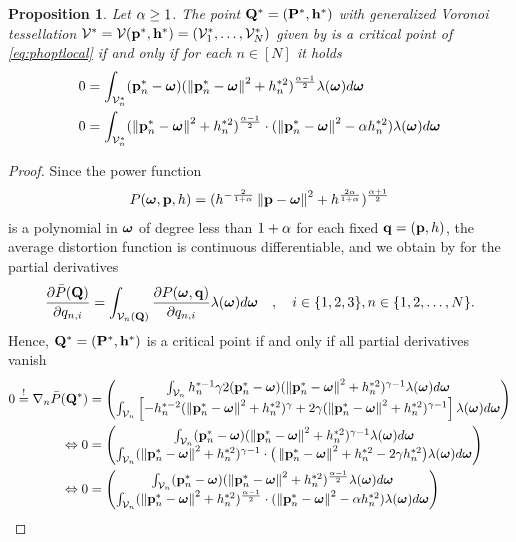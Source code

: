\documentclass[smallabstract,smallcaptions]{dccpaper}
\newtheorem{prop}{Proposition}
\newif\ifproof\prooffalse %
\newcommand{\df}{\ensuremath{\lam}}         %
\newcommand{\Pbar}{\ensuremath{\bar{P}}}         %
\newcommand{\Vor}{\ensuremath{\mathcal{V}}}         %
\begin{document}
\begin{prop}\label{prop:necessarycond}
  Let $\alpha \geq 1$. The point $\mathbf Q^*=(\mathbf P ^*,{\mathbf h}^*)$ with generalized Voronoi tessellation
  $\Vor^*=\Vor(\vp^*,\vh^*)=(\Vor_1^*,\dots,\Vor^*_N)$ given by  is a critical point of
  \eqref{eq:phoptlocal} if  and only if for each $n\in[N]$ it holds
  \begin{align}
    0&= \int_{\Vor^*_n} (\vp^*_{n}-\vome) (\Norm{\vp^*_n-\vome}^2 +h_n^{*2})^{\frac{\alp-1}{2}} \df(\vome)d
    \vome\label{eq:pnopt}\\
    0&= \int_{\Vor^*_n} (\Norm{\vp^*_n-\vome}^2 +h_n^{*2})^{\frac{\alp-1}{2}}\cdot (\Norm{\vp_n^*-\vome}^2 - \alp
    h_n^{*2} ) \df(\vome)d\vome
  \label{eq:criticalpoint}
  \end{align}
\end{prop}
%
\ifproof
\begin{proof}
Since the power function 
%
\begin{align}
  P(\boldsymbol{ \omega},{\mathbf p},h)= (h^{-\frac{2}{1+\alpha}} \left\|{\mathbf p}-\boldsymbol{ \omega}\right\| ^2 + h^{\frac{2\alpha}{1+\alpha}})^{\frac{\alpha+1}{2}}
\end{align}  
%
is a polynomial in $\boldsymbol{ \omega}$ of degree less than $1+\alpha$ for each fixed ${\mathbf q}=({\mathbf p},h)$, the average distortion function is continuous
differentiable, and we obtain by \cite[Thm.1]{WJ18} for the partial derivatives 
%
\begin{align}
  \frac{\partial \Pbar(\vQ)}{\partial q_{n,i}} = \int_{\Vor_n(\vQ)} \frac{\partial P(\vome,\vq)}{\partial q_{n,i}}
  \df(\vome)d\vome\quad,\quad i\in\{1,2,3\},n\in\{1,2,\dots,N\}.
\end{align}
%
Hence, $\mathbf Q^*=(\mathbf P ^*,{\mathbf h}^*)$ is a critical point if and only if all partial derivatives vanish 
%
\begin{align}
 0\overset{!}{=} \nabla_n \Pbar(\vQ^*) &= \begin{pmatrix} 
   \int_{\Vor_n} h_n^{*-1} \gam 2 (\vp^*_{n}-\vome)  (\Norm{\vp_n^*-\vome}^2 +h_n^{*2})^{\gam-1}  \df(\vome)d \vome\\
   \int_{\Vor_n} \left[-h_n^{*-2}(\Norm{\vp^*_n-\vome}^2 + h_n^{*2})^{\gam} + 2\gam (\Norm{\vp_n^*-\vome}^2 +h_n^{*2})^{\gam-1}\right]
    \df(\vome)d \vome
  \end{pmatrix} \notag\\
\LRA 0&= \begin{pmatrix}
  \int_{\Vor_n} (\vp^*_{n}-\vome) (\Norm{\vp^*_n-\vome}^2 +h_n^{*2})^{\gam-1} \df(\vome)d \vome\\
  \int_{\Vor_n} (\Norm{\vp^*_n-\vome}^2 +h_n^{*2})^{\gam-1}\cdot \big(\Norm{\vp^*_n-\vome}^2+h_n^{*2} - 2\gam h_n^{*2} \big)
  \df(\vome)d \vome
 \end{pmatrix}\notag\\
 \LRA 0&= \begin{pmatrix}
   \int_{\Vor_n} (\vp_{n}^*-\vome) (\Norm{\vp^*_n-\vome}^2 +h_n^{*2})^{\frac{\alp-1}{2}} \df(\vome)d \vome\\
   \int_{\Vor_n} (\Norm{\vp_n^*-\vome}^2 +h_n^{*2})^{\frac{\alp-1}{2}}\cdot (\Norm{\vp_n^*-\vome}^2 - \alp h_n^{*2} )
   \df(\vome)d \vome
  \end{pmatrix}\label{eq:graddph}
\end{align}
%
\end{proof}
\end{document}
